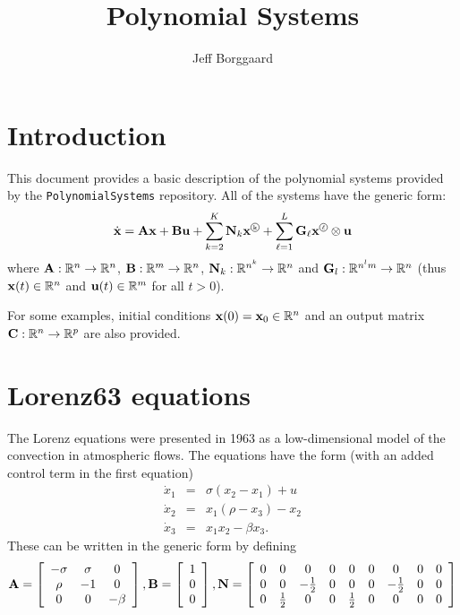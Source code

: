 \documentclass[11pt, oneside]{article}   	%
\title{Polynomial Systems}
\author{Jeff Borggaard}
\newcommand*\circled[1]{\tikz[baseline=(char.base)]{
\node[shape=circle, draw, inner sep=0.6pt] (char) {#1};}
}
\newcommand\kronF[2]{#1^{\circled{\tiny{#2}}}}
\begin{document}
\maketitle
\section{Introduction}
This document provides a basic description of the polynomial systems provided by the {\tt PolynomialSystems} repository.  All of the systems have the generic form:
%
\begin{displaymath}
  \dot{\bf x} = {\bf A}{\bf x} + {\bf B}{\bf u} + \sum_{k=2}^{K} {\bf N}_k \kronF{{\bf x}}{k} + \sum_{\ell=1}^{L} {\bf G}_{\ell} \kronF{{\bf x}}{$\ell$}\otimes{\bf u}
\end{displaymath}
%
where ${\bf A}: \mathbb{R}^n\rightarrow\mathbb{R}^n$, ${\bf B}:\mathbb{R}^m\rightarrow\mathbb{R}^n$, ${\bf N}_k: \mathbb{R}^{n^k}\rightarrow\mathbb{R}^n$ and ${\bf G}_l: \mathbb{R}^{n^l m}\rightarrow\mathbb{R}^n$ (thus ${\bf x}(t)\in \mathbb{R}^n$ and ${\bf u}(t)\in \mathbb{R}^m$ for all $t>0$).

For some examples, initial conditions ${\bf x}(0) = {\bf x}_0\in\mathbb{R}^n$ and an output matrix ${\bf C}: \mathbb{R}^n\rightarrow\mathbb{R}^p$ are also provided.


\section{Lorenz63 equations}

The Lorenz equations were presented in 1963 as a low-dimensional model of the convection in atmospheric flows.  The equations have the form (with an added control term in the first equation)
%
\begin{eqnarray*}
  \dot{x}_1 &=& \sigma(x_2-x_1) + u \\
  \dot{x}_2 &=& x_1(\rho-x_3) - x_2 \\
  \dot{x}_3 &=& x_1x_2 - \beta x_3.
\end{eqnarray*}
%
These can be written in the generic form by defining
%
\begin{displaymath}
  {\bf A} = \left[ \begin{array}{ccc} 
    -\sigma & \sigma & 0 \\
    \rho    & -1     & 0 \\
    0       &  0     & -\beta
    \end{array} \right],
  {\bf B} = \left[ \begin{array}{c} 1 \\ 0 \\ 0 \end{array} \right],
  {\bf N} = \left[ \begin{array}{ccccccccc} 
        0 & 0 & 0 & 0 & 0 & 0 & 0 & 0 & 0 \\
        0 & 0 &-\frac{1}{2} & 0 & 0 & 0 & -\frac{1}{2} & 0 & 0 \\
        0 & \frac{1}{2} & 0 & 0 & \frac{1}{2} & 0 & 0 & 0 & 0
        \end{array}\right]
\end{displaymath}
\end{document}
